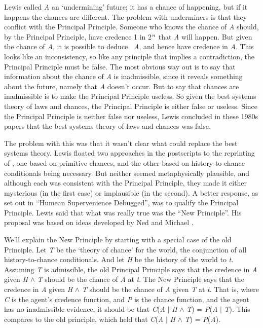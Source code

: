 Lewis called \textit{A} an `undermining' future; it has a chance of happening, but if it happens the chances are different. The problem with underminers is that they conflict with the Principal Principle. Someone who knows the chance of \textit{A} should, by the Principal Principle, have credence 1 in 2\(^\text{\textit{n}}\) that \textit{A} will happen. But given the chance of \textit{A}, it is possible to deduce ~\textit{A}, and hence have credence in \textit{A}. This looks like an inconsistency, so like any principle that implies a contradiction, the Principal Principle must be false. The most obvious way out is to say that information about the chance of \textit{A} is inadmissible, since it reveals something about the future, namely that \textit{A} doesn't occur. But to say that chances are inadmissible is to make the Principal Principle useless. So given the best systems theory of laws and chances, the Principal Principle is either false or useless. Since the Principal Principle is neither false nor useless, Lewis concluded in these 1980s papers that the best systems theory of laws and chances was false.

The problem with this was that it wasn't clear what could replace the best systems theory. Lewis floated two approaches in the postscripts to the reprinting of \citeyearpar{Lewis1980a}, one based on primitive chances, and the other based on history-to-chance conditionals being necessary. But neither seemed metaphysically plausible, and although each was consistent with the Principal Principle, they made it either mysterious (in the first case) or implausible (in the second). A better response, as set out in ``Humean Supervenience Debugged'', was to qualify the Principal Principle. Lewis said that what was really true was the ``New Principle''. His proposal was based on ideas developed by Ned \citet{Hall1994} and Michael \citet{Thau1994}.

We'll explain the New Principle by starting with a special case of the old Principle. Let \textit{T} be the `theory of chance' for the world, the conjunction of all history-to-chance conditionals. And let \textit{H} be the history of the world to \textit{t}. Assuming \textit{T} is admissible, the old Principal Principle says that the credence in \textit{A} given \textit{H} \(\wedge\) \textit{T} should be the chance of \textit{A} at \textit{t}. The New Principle says that the credence in \textit{A} given \textit{H} \(\wedge\) \textit{T} should be the chance of \textit{A} given \textit{T} at \textit{t}. That is, where \textit{C} is the agent's credence function, and \textit{P} is the chance function, and the agent has no inadmissible evidence, it should be that \textit{C}(\textit{A} \(|\) \textit{H} \(\wedge\) \textit{T}) = \textit{P}(\textit{A} \(|\) \textit{T}). This compares to the old principle, which held that \textit{C}(\textit{A} \(|\) \textit{H} \(\wedge\) \textit{T}) = \textit{P}(\textit{A}).

